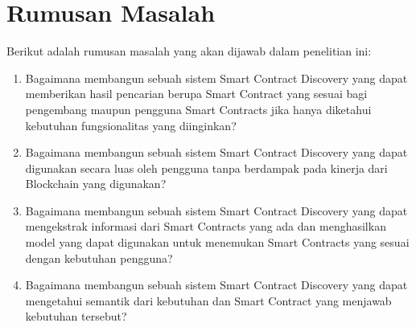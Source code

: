 \section{Rumusan Masalah}
\label{sec:rumusan-masalah}

Berikut adalah rumusan masalah yang akan dijawab dalam penelitian ini:
\begin{enumerate}
  
  \item Bagaimana membangun sebuah sistem Smart Contract Discovery yang dapat memberikan hasil pencarian berupa Smart Contract yang sesuai bagi pengembang maupun pengguna Smart Contracts jika hanya diketahui kebutuhan fungsionalitas yang diinginkan?
  \item Bagaimana membangun sebuah sistem Smart Contract Discovery yang dapat digunakan secara luas oleh pengguna tanpa berdampak pada kinerja dari Blockchain yang digunakan?
  \item Bagaimana membangun sebuah sistem Smart Contract Discovery yang dapat mengekstrak informasi dari Smart Contracts yang ada dan menghasilkan model yang dapat digunakan untuk menemukan Smart Contracts yang sesuai dengan kebutuhan pengguna?
  \item Bagaimana membangun sebuah sistem Smart Contract Discovery yang dapat mengetahui semantik dari kebutuhan dan Smart Contract yang menjawab kebutuhan tersebut?
\end{enumerate}

